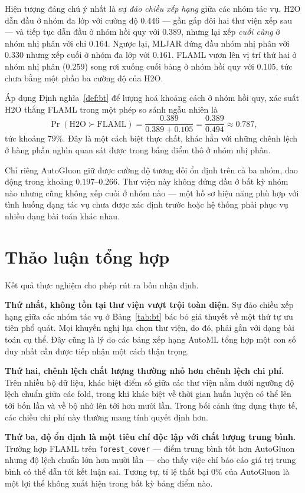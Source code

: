 Hiện tượng đáng chú ý nhất là sự \emph{đảo chiều xếp hạng} giữa các nhóm tác vụ.
H2O dẫn đầu ở nhóm đa lớp với cường độ $0.446$ --- gần gấp đôi hai thư viện xếp
sau --- và tiếp tục dẫn đầu ở nhóm hồi quy với $0.389$, nhưng lại xếp \emph{cuối
cùng} ở nhóm nhị phân với chỉ $0.164$. Ngược lại, MLJAR đứng đầu nhóm nhị phân với
$0.330$ nhưng xếp cuối ở nhóm đa lớp với $0.161$. FLAML vươn lên vị trí thứ hai ở
nhóm nhị phân ($0.259$) song rơi xuống cuối bảng ở nhóm hồi quy với $0.105$, tức
chưa bằng một phần ba cường độ của H2O.

Áp dụng Định nghĩa~\ref{def:bt} để lượng hoá khoảng cách ở nhóm hồi quy, xác suất
H2O thắng FLAML trong một phép so sánh ngẫu nhiên là
\[
    \Pr(\text{H2O} \succ \text{FLAML})
    = \frac{0.389}{0.389 + 0.105} = \frac{0.389}{0.494} \approx 0.787,
\]
tức khoảng $79\%$. Đây là một cách biệt thực chất, khác hẳn với những chênh lệch ở
hàng phần nghìn quan sát được trong bảng điểm thô ở nhóm nhị phân.

Chỉ riêng AutoGluon giữ được cường độ tương đối ổn định trên cả ba nhóm, dao động
trong khoảng $0.197$--$0.266$. Thư viện này không đứng đầu ở bất kỳ nhóm nào nhưng
cũng không xếp cuối ở nhóm nào --- một hồ sơ hiệu năng phù hợp với tình huống dạng
tác vụ chưa được xác định trước hoặc hệ thống phải phục vụ nhiều dạng bài toán
khác nhau.

\section{Thảo luận tổng hợp}
\label{sec:thaoluan-tn}
Kết quả thực nghiệm cho phép rút ra bốn nhận định.

\textbf{Thứ nhất, không tồn tại thư viện vượt trội toàn diện.} Sự đảo chiều xếp
hạng giữa các nhóm tác vụ ở Bảng~\ref{tab:bt} bác bỏ giả thuyết về một thứ tự ưu
tiên phổ quát. Mọi khuyến nghị lựa chọn thư viện, do đó, phải gắn với dạng bài
toán cụ thể. Đây cũng là lý do các bảng xếp hạng AutoML tổng hợp một con số duy
nhất cần được tiếp nhận một cách thận trọng.

\textbf{Thứ hai, chênh lệch chất lượng thường nhỏ hơn chênh lệch chi phí.} Trên
nhiều bộ dữ liệu, khác biệt điểm số giữa các thư viện nằm dưới ngưỡng độ lệch
chuẩn giữa các fold, trong khi khác biệt về thời gian huấn luyện có thể lên tới
bốn lần và về bộ nhớ lên tới hơn mười lần. Trong bối cảnh ứng dụng thực tế, các
chiều chi phí này thường mang tính quyết định hơn.

\textbf{Thứ ba, độ ổn định là một tiêu chí độc lập với chất lượng trung bình.}
Trường hợp FLAML trên \texttt{forest\_cover} --- điểm trung bình tốt hơn AutoGluon
nhưng độ lệch chuẩn lớn hơn mười lần --- cho thấy việc chỉ báo cáo giá trị trung
bình có thể dẫn tới kết luận sai. Tương tự, tỉ lệ thất bại $0\%$ của AutoGluon là
một lợi thế không xuất hiện trong bất kỳ bảng điểm nào.

